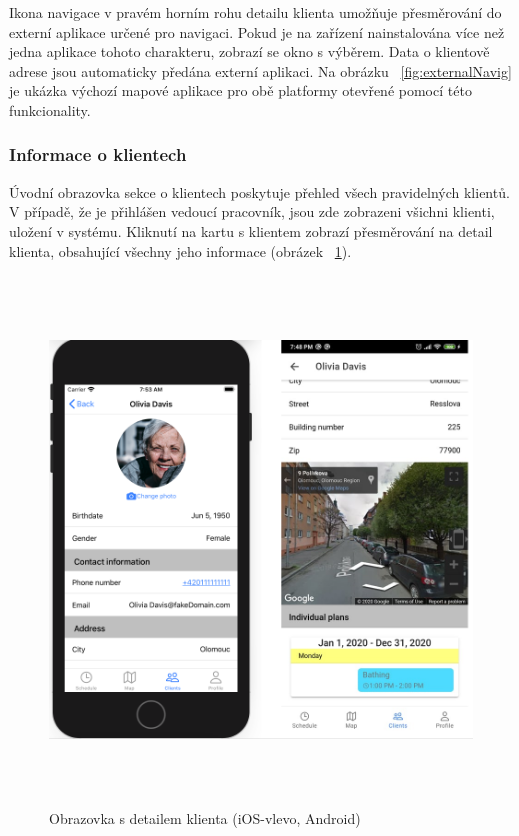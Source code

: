 \documentclass[
  glossaries,
]{kidiplom}
\begin{document}
Ikona navigace v pravém horním rohu detailu klienta umožňuje přesměrování do externí aplikace určené pro navigaci. Pokud je na zařízení nainstalována více než jedna aplikace tohoto charakteru, zobrazí se okno s výběrem. Data o klientově adrese jsou automaticky předána externí aplikaci. Na obrázku ~\ref{fig:externalNavig} je ukázka výchozí mapové aplikace pro obě platformy otevřené pomocí této funkcionality.

\subsubsection{Informace o klientech}
Úvodní obrazovka sekce o klientech poskytuje přehled všech pravidelných klientů. V případě, že je přihlášen vedoucí pracovník, jsou zde zobrazeni všichni klienti, uložení v systému. Kliknutí na kartu s klientem zobrazí přesměrování na detail klienta, obsahující všechny jeho informace (obrázek ~\ref{fig:clientDetail}).

\begin{figure}[H]
  	\centering
 	 \includegraphics[width=14cm,height=14cm,keepaspectratio]{client_detail}
 	 \caption{Obrazovka s detailem klienta (iOS-vlevo, Android)}
 	 \label{fig:clientDetail}
\end{figure}
\end{document}
